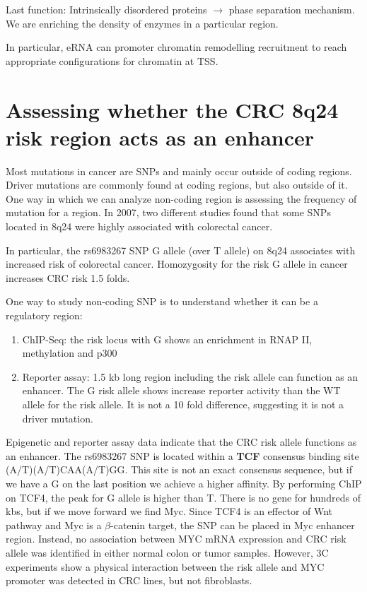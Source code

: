 Last function: Intrinsically disordered proteins $\rightarrow$ phase separation mechanism. We are enriching the density of enzymes in a particular region.

In particular, eRNA can promoter chromatin remodelling recruitment to reach appropriate configurations for chromatin at TSS.

\hypertarget{assessing-whether-the-crc-8q24-risk-region-acts-as-an-enhancer}{%
\section{Assessing whether the CRC 8q24 risk region acts as an enhancer}\label{assessing-whether-the-crc-8q24-risk-region-acts-as-an-enhancer}}

Most mutations in cancer are SNPs and mainly occur outside of coding regions. Driver mutations are commonly found at coding regions, but also outside of it. One way in which we can analyze non-coding region is assessing the frequency of mutation for a region. In 2007, two different studies found that some SNPs located in 8q24 were highly associated with colorectal cancer.

In particular, the rs6983267 SNP G allele (over T allele) on 8q24 associates with increased risk of colorectal cancer. Homozygosity for the risk G allele in cancer increases CRC risk 1.5 folds.

One way to study non-coding SNP is to understand whether it can be a regulatory region:

\begin{enumerate}
\def\labelenumi{\arabic{enumi}.}
\tightlist
\item
  ChIP-Seq: the risk locus with G shows an enrichment in RNAP II, methylation and p300
\item
  Reporter assay: 1.5 kb long region including the risk allele can function as an enhancer. The G risk allele shows increase reporter activity than the WT allele for the risk allele. It is not a 10 fold difference, suggesting it is not a driver mutation.
\end{enumerate}

Epigenetic and reporter assay data indicate that the CRC risk allele functions as an enhancer.
The rs6983267 SNP is located within a \textbf{TCF} consensus binding site (A/T)(A/T)CAA(A/T)GG. This site is not an exact consensus sequence, but if we have a G on the last position we achieve a higher affinity. By performing ChIP on TCF4, the peak for G allele is higher than T. There is no gene for hundreds of kbs, but if we move forward we find Myc. Since TCF4 is an effector of Wnt pathway and Myc is a $\beta$-catenin target, the SNP can be placed in Myc enhancer region. Instead, no association between MYC mRNA expression and CRC risk allele was identified in either normal colon or tumor samples. However, 3C experiments show a physical interaction between the risk allele and MYC promoter was detected in CRC lines, but not fibroblasts.

